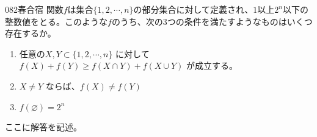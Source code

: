 \begin{thm}{082}{}{春合宿}
 関数$f$は集合$\{1, 2, \cdots, n\}$の部分集合に対して定義され、$1$以上$2^n$以下の整数値をとる。このような$f$のうち、次の3つの条件を満たすようなものはいくつ存在するか。
 \begin{enumerate}
  \renewcommand{\labelenumi}{\arabic{enumi}.}
  \item 任意の$X, Y \subset \{1, 2, \cdots, n\}$ に対して $f(X)+f(Y) \ge f(X\cap Y)+f(X\cup Y)$ が成立する。
  \item $X \neq Y$ ならば、$f(X)\neq f(Y)$
  \item $f(\varnothing)=2^n$
 \end{enumerate}
\end{thm}

ここに解答を記述。